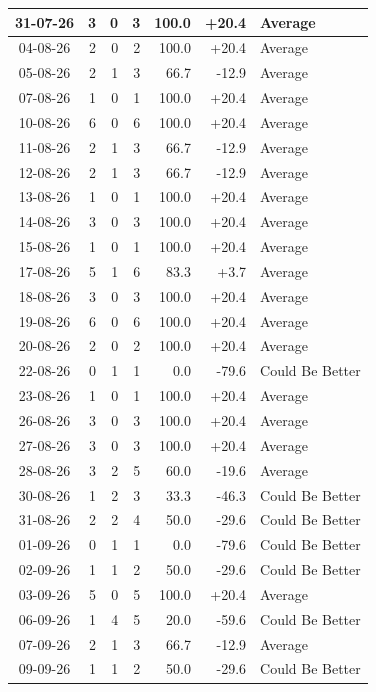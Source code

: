 \documentclass[journal]{IEEEtran}
\numberwithin{equation}{subsection}
\begin{document}
\begin{longtable}{|c|r|r|r|r|r|l|}
31-07-26 & 3 & 0 & 3 & 100.0 & +20.4 & Average\\ \hline
04-08-26 & 2 & 0 & 2 & 100.0 & +20.4 & Average\\ \hline
05-08-26 & 2 & 1 & 3 & 66.7 & -12.9 & Average\\ \hline
07-08-26 & 1 & 0 & 1 & 100.0 & +20.4 & Average\\ \hline
10-08-26 & 6 & 0 & 6 & 100.0 & +20.4 & Average\\ \hline
11-08-26 & 2 & 1 & 3 & 66.7 & -12.9 & Average\\ \hline
12-08-26 & 2 & 1 & 3 & 66.7 & -12.9 & Average\\ \hline
13-08-26 & 1 & 0 & 1 & 100.0 & +20.4 & Average\\ \hline
14-08-26 & 3 & 0 & 3 & 100.0 & +20.4 & Average\\ \hline
15-08-26 & 1 & 0 & 1 & 100.0 & +20.4 & Average\\ \hline
17-08-26 & 5 & 1 & 6 & 83.3 & +3.7 & Average\\ \hline
18-08-26 & 3 & 0 & 3 & 100.0 & +20.4 & Average\\ \hline
19-08-26 & 6 & 0 & 6 & 100.0 & +20.4 & Average\\ \hline
20-08-26 & 2 & 0 & 2 & 100.0 & +20.4 & Average\\ \hline
22-08-26 & 0 & 1 & 1 & 0.0 & -79.6 & Could Be Better\\ \hline
23-08-26 & 1 & 0 & 1 & 100.0 & +20.4 & Average\\ \hline
26-08-26 & 3 & 0 & 3 & 100.0 & +20.4 & Average\\ \hline
27-08-26 & 3 & 0 & 3 & 100.0 & +20.4 & Average\\ \hline
28-08-26 & 3 & 2 & 5 & 60.0 & -19.6 & Average\\ \hline
30-08-26 & 1 & 2 & 3 & 33.3 & -46.3 & Could Be Better\\ \hline
31-08-26 & 2 & 2 & 4 & 50.0 & -29.6 & Could Be Better\\ \hline
01-09-26 & 0 & 1 & 1 & 0.0 & -79.6 & Could Be Better\\ \hline
02-09-26 & 1 & 1 & 2 & 50.0 & -29.6 & Could Be Better\\ \hline
03-09-26 & 5 & 0 & 5 & 100.0 & +20.4 & Average\\ \hline
06-09-26 & 1 & 4 & 5 & 20.0 & -59.6 & Could Be Better\\ \hline
07-09-26 & 2 & 1 & 3 & 66.7 & -12.9 & Average\\ \hline
09-09-26 & 1 & 1 & 2 & 50.0 & -29.6 & Could Be Better\\ \hline

\end{longtable}
\end{document}
